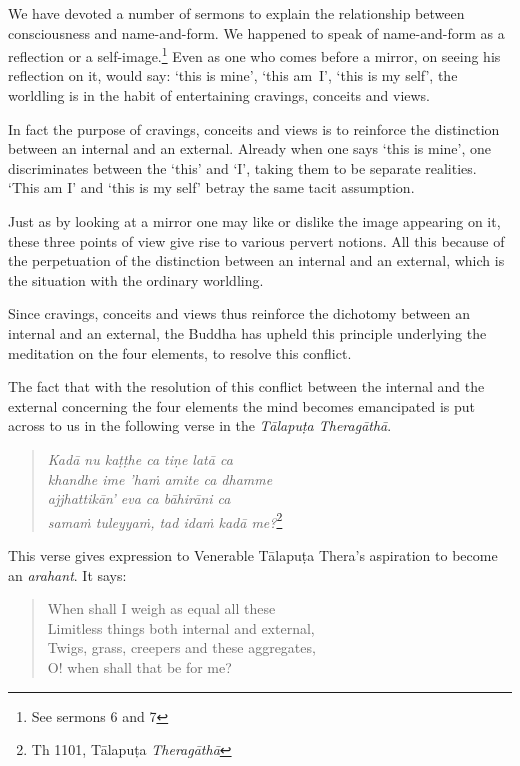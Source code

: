 We have devoted a number of sermons to explain the relationship between consciousness and name-and-form. We happened to speak of name-and-form as a reflection or a self-image.\footnote{See sermons 6 and 7} Even as one who comes before a mirror, on seeing his reflection on it, would say: `this is mine', `this am~I', `this is my self', the worldling is in the habit of entertaining cravings, conceits and views.

In fact the purpose of cravings, conceits and views is to reinforce the distinction between an internal and an external. Already when one says `this is mine', one discriminates between the `this' and `I', taking them to be separate realities. `This am I' and `this is my self' betray the same tacit assumption.

Just as by looking at a mirror one may like or dislike the image appearing on it, these three points of view give rise to various pervert notions. All this because of the perpetuation of the distinction between an internal and an external, which is the situation with the ordinary worldling.

Since cravings, conceits and views thus reinforce the dichotomy between an internal and an external, the Buddha has upheld this principle underlying the meditation on the four elements, to resolve this conflict.

The fact that with the resolution of this conflict between the internal and the external concerning the four elements the mind becomes emancipated is put across to us in the following verse in the \emph{Tālapuṭa Theragāthā}.

\enlargethispage{\baselineskip}

\begin{quote}
\emph{Kadā nu kaṭṭhe ca tiṇe latā ca}\\
\emph{khandhe ime 'haṁ amite ca dhamme}\\
\emph{ajjhattikān' eva ca bāhirāni ca}\\
\emph{samaṁ tuleyyaṁ, tad idaṁ kadā me?}\footnote{Th 1101, Tālapuṭa \emph{Theragāthā}}
\end{quote}

This verse gives expression to Venerable Tālapuṭa Thera's aspiration to become an \emph{arahant}. It says:

\begin{quote}
When shall I weigh as equal all these\\
Limitless things both internal and external,\\
Twigs, grass, creepers and these aggregates,\\
O! when shall that be for me?
\end{quote}

